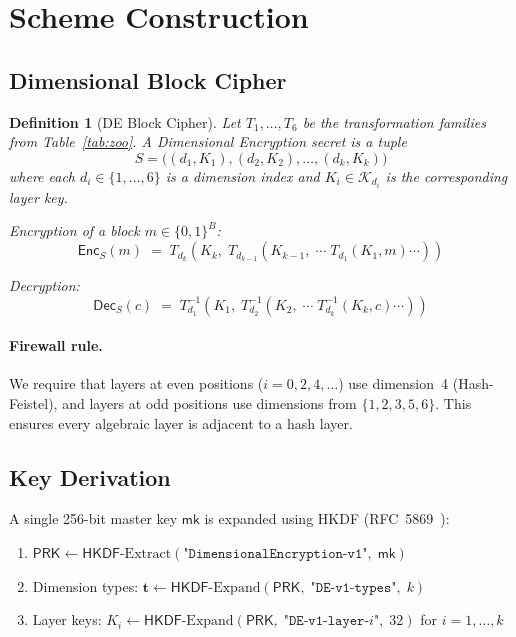 \documentclass[11pt]{article}
\newtheorem{definition}{Definition}
\newcommand{\DE}{\textsf{DE}}
\newcommand{\Enc}{\textsf{Enc}}
\newcommand{\Dec}{\textsf{Dec}}
\newcommand{\HKDF}{\textsf{HKDF}}
\begin{document}
\section{Scheme Construction}
\label{sec:scheme}

\subsection{Dimensional Block Cipher}

\begin{definition}[\DE{} Block Cipher]
\label{def:de}
Let $T_1, \ldots, T_6$ be the transformation families from
Table~\ref{tab:zoo}. A \emph{Dimensional Encryption secret} is a tuple
\[
S = \bigl((d_1, K_1), (d_2, K_2), \ldots, (d_k, K_k)\bigr)
\]
where each $d_i \in \{1, \ldots, 6\}$ is a dimension index and $K_i \in
\mathcal{K}_{d_i}$ is the corresponding layer key.

Encryption of a block $m \in \{0,1\}^B$:
\[
\Enc_S(m) \;=\; T_{d_k}(K_k, \; T_{d_{k-1}}(K_{k-1}, \; \cdots \; T_{d_1}(K_1, m) \cdots))
\]

Decryption:
\[
\Dec_S(c) \;=\; T_{d_1}^{-1}(K_1, \; T_{d_2}^{-1}(K_2, \; \cdots \; T_{d_k}^{-1}(K_k, c) \cdots))
\]
\end{definition}

\paragraph{Firewall rule.}
We require that layers at even positions ($i = 0, 2, 4, \ldots$) use
dimension~4 (Hash-Feistel), and layers at odd positions use dimensions
from $\{1, 2, 3, 5, 6\}$. This ensures every algebraic layer is
adjacent to a hash layer.

\subsection{Key Derivation}

A single 256-bit master key $\textsf{mk}$ is expanded using HKDF
(RFC~5869~\cite{rfc5869}):

\begin{enumerate}[leftmargin=*]
\item $\textsf{PRK} \leftarrow \HKDF\text{-Extract}(\texttt{"DimensionalEncryption-v1"},\; \textsf{mk})$
\item Dimension types: $\mathbf{t} \leftarrow \HKDF\text{-Expand}(\textsf{PRK},\; \texttt{"DE-v1-types"},\; k)$
\item Layer keys: $K_i \leftarrow \HKDF\text{-Expand}(\textsf{PRK},\; \texttt{"DE-v1-layer-}i\texttt{"},\; 32)$ for $i = 1, \ldots, k$
\end{enumerate}
\end{document}
